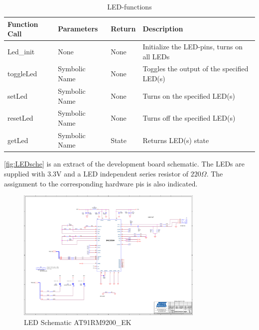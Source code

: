 \begin{table}[H]
\begin{tabular}{llll} %
\textbf{Function Call}	 &\textbf{Parameters}  &\textbf{Return} &\textbf{Description} \\
\hline
\hline
Led\_init									&None 	&None & Initialize the LED-pins, turns on all LEDs\\
toggleLed			&Symbolic Name 	&None & Toggles the output of the specified LED(s)\\
setLed					&Symbolic Name 	&None & Turns on the specified LED(s)\\
resetLed			&Symbolic Name 	&None & Turns off the specified LED(s)\\
getLed	&Symbolic Name 	&State & Returns LED(s) state\\ 
\end{tabular}
\caption{LED-functions}
\label{tab:LEDcomands}
\end{table}

\autoref{fig:LEDsche} is an extract of the development board schematic. The LEDs are supplied with 3.3V and a LED independent series resistor of $220\Omega$. The assignment to the corresponding hardware pis is also indicated.\\ 

\begin{figure}[H]
\begin{center}
	\includegraphics[width=0.8\textwidth]{images/LedScematic.pdf}
		\caption[LED Schematic AT91RM9200\_EK] {LED Schematic AT91RM9200\_EK \cite{AT91LED}}
	\label{fig:LEDsche}
\end{center}
\end{figure}






